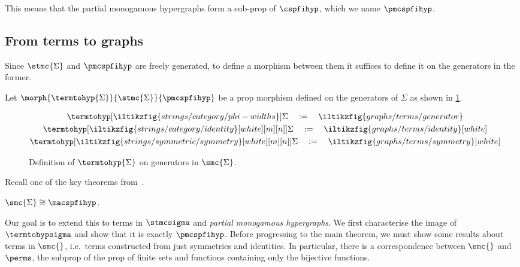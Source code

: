 \noindent
This means that the partial monogamous hypergraphs form a sub-prop of \(\cspfihyp\), which we name \(\pmcspfihyp\).

\subsection{From terms to graphs}

Since \(\stmc{\Sigma}\) and \(\pmcspfihyp\) are freely generated, to define a morphism between them it suffices to define it on the generators in the former.

\begin{definition}
    Let \(\morph{\termtohyp{\Sigma}}{\stmc{\Sigma}}{\pmcspfihyp}\) be a prop morphism defined on the generators of \(\Sigma\) as shown in \cref{fig:termtohyp}.
    \begin{figure}
        \begin{gather*}
            \termtohyp[\iltikzfig{strings/category/phi-widths}]{\Sigma}
            \quad
            :=
            \quad
            \iltikzfig{graphs/terms/generator} \\
            \termtohyp[\iltikzfig{strings/category/identity}[white][m][n]]{\Sigma}
            \quad
            :=
            \quad \iltikzfig{graphs/terms/identity}[white] \\
            \termtohyp[\iltikzfig{strings/symmetric/symmetry}[white][m][n]]{\Sigma}
            \quad
            :=
            \quad
            \iltikzfig{graphs/terms/symmetry}[white]
        \end{gather*}
        \caption{Definition of \(\termtohyp{\Sigma}\) on generators in \(\smc{\Sigma}\).}
        \label{fig:termtohyp}
    \end{figure}
\end{definition}

\noindent
Recall one of the key theorems from~\cite{bonchi2021string}.

\begin{theorem}\label{thm:smc-graph-iso}
    \(\smc{\Sigma} \cong \macspfihyp\).
\end{theorem}

\noindent
Our goal is to extend this to terms in \(\stmcsigma\) and \emph{partial monogamous hypergraphs}.
We first characterise the image of \(\termtohypsigma\) and show that it is exactly \(\pmcspfihyp\).
Before progressing to the main theorem, we must show some results about terms in \(\smc{}\), i.e.\ terms constructed from just symmetries and identities.
In particular, there is a correspondence between \(\smc{}\) and \(\perms\), the subprop of the prop of finite sets and functions containing only the bijective functions.


